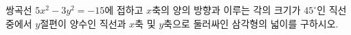 쌍곡선 $5x^2-3y^2=-15$에 접하고 $x$축의 양의 방향과 이루는 각의 크기가 $45^\circ$인 직선 중에서 $y$절편이 양수인 직선과 $x$축 및 $y$축으로 둘러싸인 삼각형의 넓이를 구하시오.

